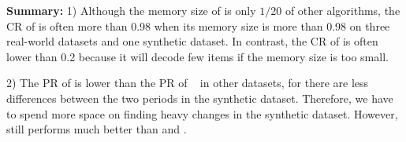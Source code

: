 \noindent\textbf{Summary:}
%
1) Although the memory size of \sketchname{} is only $1/20$ of other algorithms, the CR of \sketchname{} is often more than 0.98 when its memory size is more than 0.98 on three real-world datasets and one synthetic dataset. 
In contrast, the CR of \chafr{} is often lower than 0.2 because it will decode few items if the memory size is too small.

2) The PR of \sketchname{} is lower than the PR of \sketchname~ in other datasets, for there are less differences between the two periods in the synthetic dataset. Therefore, we have to spend more space on finding heavy changes in the synthetic dataset. However, \sketchname{} still performs much better than \chafr{} and \chafrcf.